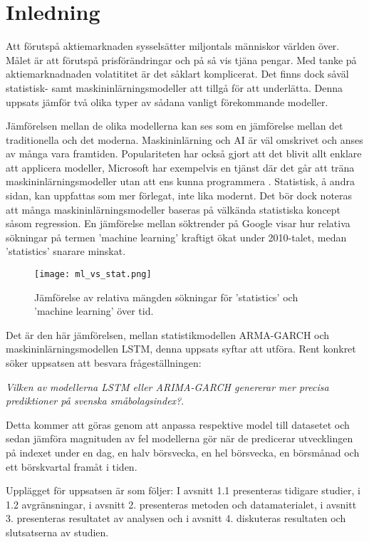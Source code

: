 \documentclass[12pt]{article}
\begin{document}
\newpage


\clearpage
\setcounter{page}{1} %

\section{Inledning}
Att förutspå aktiemarknaden sysselsätter miljontals människor världen över. Målet är att förutspå prisförändringar och på så vis tjäna pengar. Med tanke på aktiemarknadnaden volatititet är det såklart komplicerat. Det finns dock såväl statistisk- samt maskininlärningsmodeller att tillgå för att underlätta. Denna uppsats jämför två olika typer av sådana vanligt förekommande modeller. \par
Jämförelsen mellan de olika modellerna kan ses som en jämförelse mellan det traditionella och det moderna. Maskininlärning och AI är väl omskrivet och anses av många vara framtiden. Populariteten har också gjort att det blivit allt enklare att applicera modeller, Microsoft har exempelvis en tjänst där det går att träna maskininlärningsmodeller utan att ens kunna programmera \parencite{lobe}. Statistisk, å andra sidan, kan uppfattas som mer förlegat, inte lika modernt. Det bör dock noteras att många maskininlärningsmodeller baseras på välkända statistiska koncept såsom regression. En jämförelse mellan söktrender på Google visar hur relativa sökningar på termen 'machine learning' kraftigt ökat under 2010-talet, medan 'statistics' snarare minskat. 
\begin{figure}[H]
\caption{Jämförelse av relativa mängden sökningar för 'statistics' och 'machine learning' över tid.}
\texttt{[image: ml\_vs\_stat.png]}
\centering
\end{figure}
Det är den här jämförelsen, mellan statistikmodellen ARMA-GARCH och maskininlärningsmodellen LSTM, denna uppsats syftar att utföra. Rent konkret söker uppsatsen att besvara frågeställningen: \par 
\emph{Vilken av modellerna LSTM eller ARIMA-GARCH genererar mer precisa prediktioner på svenska småbolagsindex?}. \par
Detta kommer att göras genom att anpassa respektive model till datasetet och sedan jämföra magnituden av fel modellerna gör när de predicerar utvecklingen på indexet under en dag, en halv börsvecka, en hel börsvecka, en börsmånad och ett börskvartal framåt i tiden. \par 
Upplägget för uppsatsen är som följer: I avsnitt 1.1 presenteras tidigare studier, i 1.2 avgränsningar, i avsnitt 2. presenteras metoden och datamaterialet, i avsnitt 3. presenteras resultatet av analysen och i avsnitt 4. diskuteras resultaten och slutsatserna av studien. \par
\end{document}
